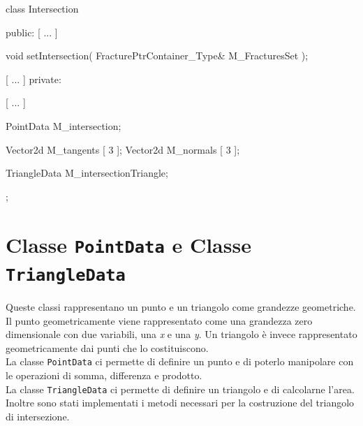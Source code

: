 \begin{Code03_03}[caption={Classe \texttt{Intersection}}]
class Intersection
{
 public:
	[ ... ]
	
	void setIntersection( FracturePtrContainer_Type& M_FracturesSet );
	
	[ ... ]
 private:
	
	[ ... ]	
	
	PointData M_intersection;
	
	Vector2d M_tangents [ 3 ];
	Vector2d M_normals [ 3 ];
	
	TriangleData M_intersectionTriangle;
};	
\end{Code03_03}

\section{Classe \texttt{PointData} e Classe \texttt{TriangleData}}
Queste classi rappresentano un punto e un triangolo come grandezze geometriche.
Il punto geometricamente viene rappresentato come una grandezza zero dimensionale con due variabili, una \textit{x} e una \textit{y}.
Un triangolo è invece  rappresentato geometricamente dai punti che lo costituiscono.\\
\noindent La classe \texttt{PointData} ci permette di definire un punto e di poterlo manipolare con le operazioni di somma, differenza e prodotto.\\
\noindent La classe \texttt{TriangleData} ci permette di definire un triangolo e di calcolarne l'area. Inoltre sono stati implementati i metodi necessari per la costruzione del triangolo di intersezione.
